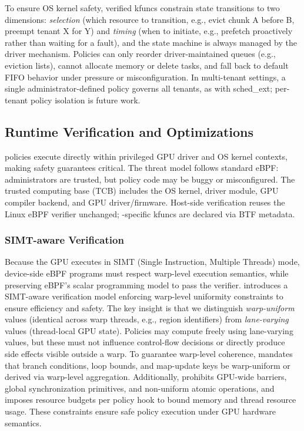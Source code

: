 To ensure OS kernel safety, verified kfuncs constrain state transitions to two dimensions: \emph{selection} (which resource to transition, e.g., evict chunk A before B, preempt tenant X for Y) and \emph{timing} (when to initiate, e.g., prefetch proactively rather than waiting for a fault), and the state machine is always managed by the driver mechanism. Policies can only reorder driver-maintained queues (e.g., eviction lists), cannot allocate memory or delete tasks, and fall back to default FIFO behavior under pressure or misconfiguration. In multi-tenant settings, a single administrator-defined policy governs all tenants, as with sched\_ext; per-tenant policy isolation is future work.

\subsection{Runtime Verification and Optimizations}
\label{sec:verification}

\sys policies execute directly within privileged GPU driver and OS kernel contexts, making safety guarantees critical. The threat model follows standard eBPF: administrators are trusted, but policy code may be buggy or misconfigured. The trusted computing base (TCB) includes the OS kernel, \sys driver module, GPU compiler backend, and GPU driver/firmware. Host-side verification reuses the Linux eBPF verifier unchanged; \sys-specific kfuncs are declared via BTF metadata.

\subsubsection{SIMT-aware Verification}

Because the GPU executes in SIMT (Single Instruction, Multiple Threads) mode, device-side eBPF programs must respect warp-level execution semantics, while preserving eBPF's scalar programming model to pass the verifier. \sys introduces a SIMT-aware verification model enforcing warp-level uniformity constraints to ensure efficiency and safety.
The key insight is that we distinguish \emph{warp-uniform} values (identical across warp threads, e.g., region identifiers) from \emph{lane-varying} values (thread-local GPU state). Policies may compute freely using lane-varying values, but these must not influence control-flow decisions or directly produce side effects visible outside a warp. To guarantee warp-level coherence, \sys mandates that branch conditions, loop bounds, and map-update keys be warp-uniform or derived via warp-level aggregation. Additionally, \sys prohibits GPU-wide barriers, global synchronization primitives, and non-uniform atomic operations, and imposes resource budgets per policy hook to bound memory and thread resource usage. These constraints ensure safe policy execution under GPU hardware semantics.

